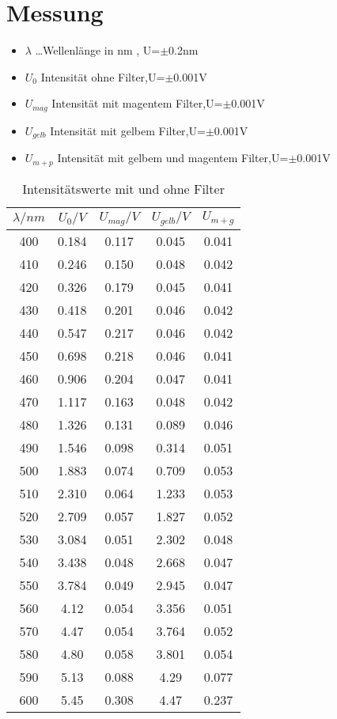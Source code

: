 \documentclass[a4paper]{article}
\begin{document}
\section{Messung}
\begin{table}
				\centering
				\caption{Intensitätswerte mit und ohne Filter}
				\begin{itemize}
								\item $\lambda$ \dots Wellenlänge in nm , U=$\pm$0.2nm
								\item $U_0$ Intensität ohne Filter,U=$\pm$0.001V
								\item $U_{mag}$ Intensität mit magentem Filter,U=$\pm$0.001V
								\item $U_{gelb}$ Intensität mit gelbem Filter,U=$\pm$0.001V
								\item $U_{m+p}$ Intensität mit gelbem und magentem Filter,U=$\pm$0.001V
				\end{itemize}
				\begin{tabular}{|c|c|c|c|c|}
								\hline
							$	\lambda/nm$  & $U_0 / V$ & $U_{mag}/V$ & $U_{gelb}/V$ & $U_{m+g}$ \\ \hline
 400 & 0.184 & 0.117 & 0.045 & 0.041 \\ \hline
 410 & 0.246 & 0.150 & 0.048 & 0.042 \\ \hline
 420 & 0.326 & 0.179 & 0.045 & 0.041 \\ \hline
 430 & 0.418 & 0.201 & 0.046 & 0.042 \\ \hline
 440 & 0.547 & 0.217 & 0.046 & 0.042 \\ \hline
 450 & 0.698 & 0.218 & 0.046 & 0.041 \\ \hline
 460 & 0.906 & 0.204 & 0.047 & 0.041 \\ \hline
 470 & 1.117 & 0.163 & 0.048 & 0.042 \\ \hline
 480 & 1.326 & 0.131 & 0.089 & 0.046 \\ \hline
 490 & 1.546 & 0.098 & 0.314 & 0.051 \\ \hline
 500 & 1.883 & 0.074 & 0.709 & 0.053 \\ \hline
 510 & 2.310 & 0.064 & 1.233 & 0.053 \\ \hline
 520 & 2.709 & 0.057 & 1.827 & 0.052 \\ \hline
 530 & 3.084 & 0.051 & 2.302 & 0.048 \\ \hline
 540 & 3.438 & 0.048 & 2.668 & 0.047 \\ \hline
 550 & 3.784 & 0.049 & 2.945 & 0.047 \\ \hline
 560 & 4.12 & 0.054 & 3.356 & 0.051 \\ \hline
 570 & 4.47 & 0.054 & 3.764 & 0.052 \\ \hline
 580 & 4.80 & 0.058 & 3.801 & 0.054 \\ \hline
 590 & 5.13 & 0.088 & 4.29 & 0.077 \\ \hline
 600 & 5.45 & 0.308 & 4.47 & 0.237\\\hline
				\end{tabular}
				\label{tab:1}
\end{table}
\end{document}
